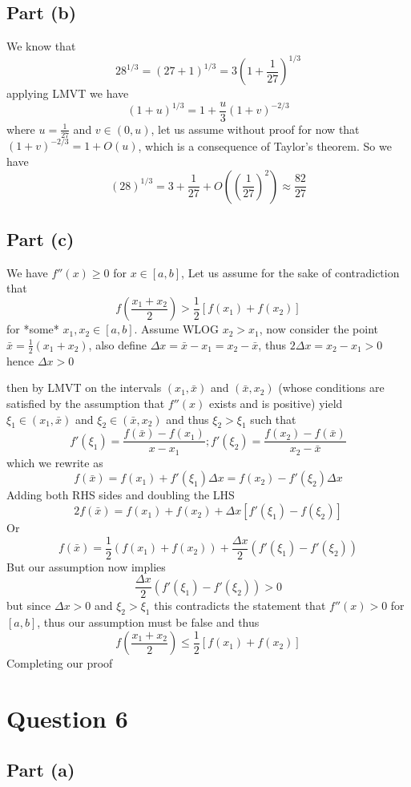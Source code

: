 \documentclass[12pt]{article}
\begin{document}
\subsection{Part (b)}
We know that
$$
28^{1/3} = (27 +1)^{1/3} = 3\left( 1 + \frac{1}{27} \right)^{1/3}
$$
applying LMVT we have
$$
\left( 1 + u \right)^{1/3} = 1 + \frac{u}{3} (1+ v)^{-2/3}
$$
where $u = \frac{1}{27}$ and $v \in (0,u)$, let us assume without proof for now that $(1+v)^{-2/3} = 1 + O(u)$, which is a consequence of Taylor's theorem. So we have
$$
(28)^{1/3} = 3 + \frac{1}{27} + O\left( \left( \frac{1}{27} \right)^{2} \right) \approx \frac{82}{27}
$$

\subsection{Part (c)}
We have $f''(x) \geq 0$ for $x \in [a,b]$, Let us assume for the sake of contradiction that
$$
f\left( \frac{x_{1} + x_{2}}{2} \right) > \frac{1}{2}[f(x_{1}) + f(x_{2})]
$$
for *some* $x_{1},x_{2} \in[a,b]$. Assume WLOG $x_{2}> x_{1}$, now consider the point $\bar{x} = \frac{1}{2}(x_{1} + x_{2})$, also define $\Delta x  = \bar{x} -x_{1} = x_{2} -\bar{x}$, thus $2\Delta x = x_{2} -x_{1} > 0$ hence $\Delta x > 0$

then by LMVT on the intervals $(x_{1},\bar{x})$ and $(\bar{x}, x_{2})$ (whose conditions are satisfied by the assumption that $f''(x)$ exists and is positive) yield $\xi_{1} \in(x_{1},\bar{x})$ and $\xi_{2} \in(\bar{x}, x_{2})$ and thus $\xi_{2} > \xi_{1}$ such that
$$
f'(\xi_{1}) = \frac{f(\bar{x})-f(x_{1})}{x-x_{1}}; f'(\xi_{2}) = \frac{f(x_{2})-f(\bar{x})}{x_{2} - \bar{x}}
$$
which we rewrite as
$$
f(\bar{x}) = f(x_{1}) + f'(\xi_{1})\Delta x = f(x_{2}) -f'(\xi_{2})\Delta x
$$
Adding both RHS sides and doubling the LHS
$$
2f(\bar{x}) = f(x_{1}) + f(x_{2}) + \Delta x [f'(\xi_{1})-f(\xi_{2})]
$$
Or
$$
f(\bar{x}) = \frac{1}{2}(f(x_{1}) + f(x_{2}))  + \frac{\Delta x}{2} (f'(\xi_{1})-f'(\xi_{2}))
$$
But our assumption now implies
$$
\frac{\Delta x}{2} (f'(\xi_{1})-f'(\xi_{2})) >0
$$
but since $\Delta x >0$ and $\xi_{2} > \xi_{1}$ this contradicts the statement that $f''(x) > 0$ for $[a,b]$, thus our assumption must be false and thus
$$
\boxed{
f\left( \frac{x_{1} + x_{2}}{2} \right) \leq \frac{1}{2}[f(x_{1}) + f(x_{2})]
}
$$
Completing our proof

\section{Question 6}
\subsection{Part (a)}
\end{document}
